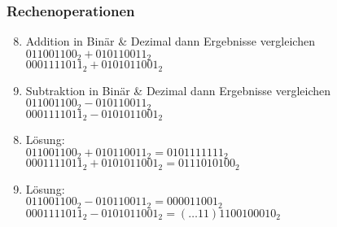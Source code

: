 \begin{frame}
    \frametitle{Rechenoperationen}
    \vspace{0.5cm}

    \begin{multicols}{2}
        \begin{enumerate}
            \setcounter{enumi}{7}
            \item Addition in Binär \& Dezimal dann Ergebnisse vergleichen \\
                \( 011001100_2 + 010110011_2 \) \\
                \( 0001111011_2 + 0101011001_2 \) \\
            \item Subtraktion in Binär \& Dezimal dann Ergebnisse vergleichen \\
                \( 011001100_2 - 010110011_2 \) \\
                \( 0001111011_2 - 0101011001_2 \) \\
        \end{enumerate}
        \vfill\columnbreak
        \pause

        \begin{enumerate}
            \setcounter{enumi}{7}
            \item Lösung: \\
                \( 011001100_2 + 010110011_2 = 0101111111_2 \) \\
                \( 0001111011_2 + 0101011001_2 = 0111010100_2 \) \\
            \item Lösung: \\
                \( 011001100_2 - 010110011_2 = 000011001_2 \) \\
                \( 0001111011_2 - 0101011001_2 =  (\hdots 11)1100100010_2\) \\
        \end{enumerate}
    \end{multicols}
\end{frame}

